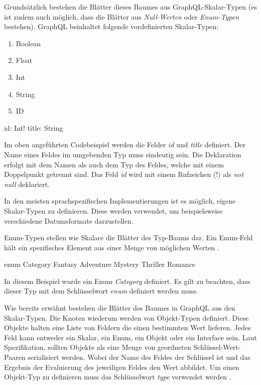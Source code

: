 Grundsätzlich bestehen die Blätter dieses Baumes aus GraphQL-Skalar-Typen (es ist zudem auch möglich, dass die Blätter aus \textit{Null-Werten} oder \textit{Enum-Typen} bestehen).
\parencite[Abs. ScalarTypeDefinition]{graphqlOnline}
GraphQL beinhaltet folgende vordefinierten Skalar-Typen:
\begin{enumerate}
    \item Boolean
    \item Float
    \item Int
    \item String
    \item ID
\end{enumerate}

\begin{JsCode}
    id: Int!
    title: String
\end{JsCode}

Im oben angeführten Codebeispiel werden die Felder \textit{id} und \textit{title} definiert.
Der Name eines Feldes im umgebenden Typ muss eindeutig sein.
Die Deklaration erfolgt mit dem Namen als auch dem Typ des Feldes, welche mit einem Doppelpunkt getrennt sind.
Das Feld \textit{id} wird mit einem Rufzeichen (!) als \textit{not null} deklariert.

In den meisten sprachspezifischen Implementierungen ist es möglich, eigene Skalar-Typen zu definieren. Diese werden verwendet, um beispielsweise verschiedene Datumsformate darzustellen.


Enum-Typen stellen wie Skalare die Blätter des Typ-Baums dar.
Ein Enum-Feld hält ein spezifisches Element aus einer Menge von möglichen Werten
\parencite[Abs. 3.9]{graphqlOnline}
\parencite[S. 60-61]{kress2020graphql}.

\begin{JsCode}
enum Category {
    Fantasy
    Adventure
    Mystery
    Thriller
    Romance
}
\end{JsCode}

In diesem Beispiel wurde ein Enum \textit{Category} definiert.
Es gilt zu beachten, dass dieser Typ mit dem Schlüsselwort \textit{enum} definiert werden muss.

Wie bereits erwähnt bestehen die Blätter des Baumes in GraphQL aus den Skalar-Typen.
Die Knoten wiederum werden von Objekt-Typen definiert.
Diese Objekte halten eine Liste von Feldern die einen bestimmten Wert lieferen.
Jedes Feld kann entweder ein Skalar, ein Enum, ein Objekt oder ein Interface sein.
Laut Spezifikation, sollten Objekte als eine Menge von geordneten Schlüssel-Wert-Paaren serialisiert werden.
Wobei der Name des Feldes der Schlüssel ist und das Ergebnis der Evaluierung des jeweiligen Feldes den Wert abbildet.
Um einen Objekt-Typ zu definieren muss das Schlüsselwort \textit{type} verwendet werden
\parencite[Abs. 3.6]{graphqlOnline}.

